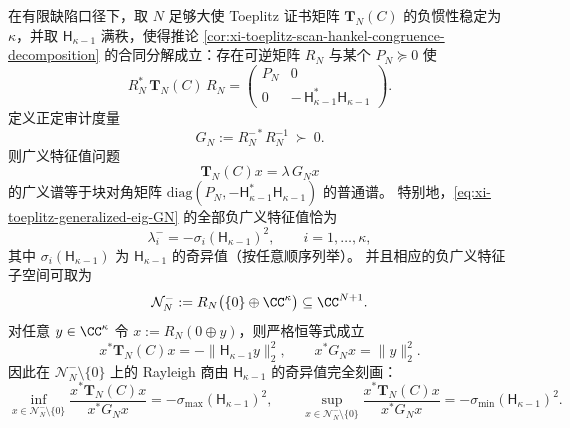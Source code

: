 \begin{theorem}\label{thm:xi-toeplitz-metric-spectrum-normal-form}
在有限缺陷口径下，取 \(N\) 足够大使 Toeplitz 证书矩阵 \(\mathbf{T}_N(C)\) 的负惯性稳定为 \(\kappa\)，并取 \(\mathsf H_{\kappa-1}\) 满秩，使得推论 \ref{cor:xi-toeplitz-scan-hankel-congruence-decomposition} 的合同分解成立：存在可逆矩阵 \(R_N\) 与某个 \(P_N\succeq 0\) 使
\begin{equation}\label{eq:xi-toeplitz-congruence-block-split}
R_N^{\ast}\,\mathbf{T}_N(C)\,R_N
=
\begin{pmatrix}
P_N & 0\\[2pt]
0 & -\,\mathsf H_{\kappa-1}^{\ast}\mathsf H_{\kappa-1}
\end{pmatrix}.
\end{equation}
定义正定审计度量
\begin{equation}\label{eq:xi-toeplitz-audit-metric-GN}
G_N:=R_N^{-*}R_N^{-1}\ \succ\ 0.
\end{equation}
则广义特征值问题
\begin{equation}\label{eq:xi-toeplitz-generalized-eig-GN}
\mathbf{T}_N(C)x=\lambda\,G_N x
\end{equation}
的广义谱等于块对角矩阵 \(\mathrm{diag}(P_N,-\mathsf H_{\kappa-1}^{\ast}\mathsf H_{\kappa-1})\) 的普通谱。
特别地，\eqref{eq:xi-toeplitz-generalized-eig-GN} 的全部负广义特征值恰为
\begin{equation}\label{eq:xi-negative-generalized-eigs-are-minus-sigmasq}
\lambda_i^-=-\sigma_i(\mathsf H_{\kappa-1})^2,\qquad i=1,\dots,\kappa,
\end{equation}
其中 \(\sigma_i(\mathsf H_{\kappa-1})\) 为 \(\mathsf H_{\kappa-1}\) 的奇异值（按任意顺序列举）。
并且相应的负广义特征子空间可取为
\begin{equation}\label{eq:xi-negative-generalized-eigenspace}
\mathcal N_N^-:=R_N\bigl(\{0\}\oplus\CC^{\kappa}\bigr)\subseteq \CC^{N+1}.
\end{equation}
对任意 \(y\in\CC^{\kappa}\) 令 \(x:=R_N(0\oplus y)\)，则严格恒等式成立
\begin{equation}\label{eq:xi-rayleigh-quotient-identities}
x^{\ast}\mathbf{T}_N(C)x=-\|\mathsf H_{\kappa-1}y\|_2^2,
\qquad
x^{\ast}G_N x=\|y\|_2^2.
\end{equation}
因此在 \(\mathcal N_N^-\setminus\{0\}\) 上的 Rayleigh 商由 \(\mathsf H_{\kappa-1}\) 的奇异值完全刻画：
\begin{equation}\label{eq:xi-rayleigh-negative-extrema-sigma}
\inf_{x\in\mathcal N_N^-\setminus\{0\}}
\frac{x^{\ast}\mathbf{T}_N(C)x}{x^{\ast}G_N x}
=-\sigma_{\max}(\mathsf H_{\kappa-1})^2,
\qquad
\sup_{x\in\mathcal N_N^-\setminus\{0\}}
\frac{x^{\ast}\mathbf{T}_N(C)x}{x^{\ast}G_N x}
=-\sigma_{\min}(\mathsf H_{\kappa-1})^2.
\end{equation}
\end{theorem}
